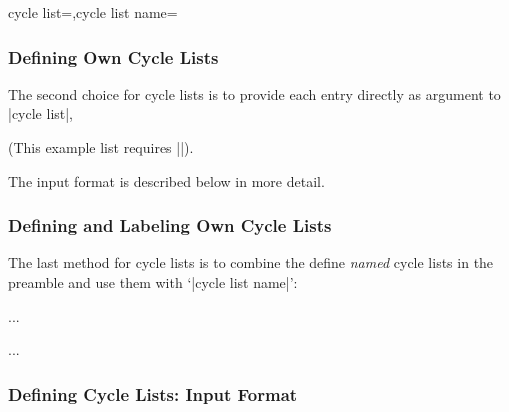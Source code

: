 \begin{pgfplotskeylist}{cycle list=,cycle list name=}
    \subsubsection{Defining Own Cycle Lists}

    The second choice for cycle lists is to provide each entry directly as
    argument to |cycle list|,
\begin{codeexample}[]
\end{codeexample}
    (This example list requires |\usetikzlibrary{plotmarks}|).

    The input format is described below in more detail.


    \subsubsection{Defining and Labeling Own Cycle Lists}

    The last method for cycle lists is to combine the define \emph{named} cycle
    lists in the preamble and use them with `|cycle list name|':
    \begin{command}{\pgfplotscreateplotcyclelist{}}%
    \end{command}
\begin{codeexample}
...
\begin{axis}[cycle list name=mylist]
    ...
\end{axis}
\end{codeexample}


    \subsubsection{Defining Cycle Lists: Input Format}


\end{pgfplotskeylist}
